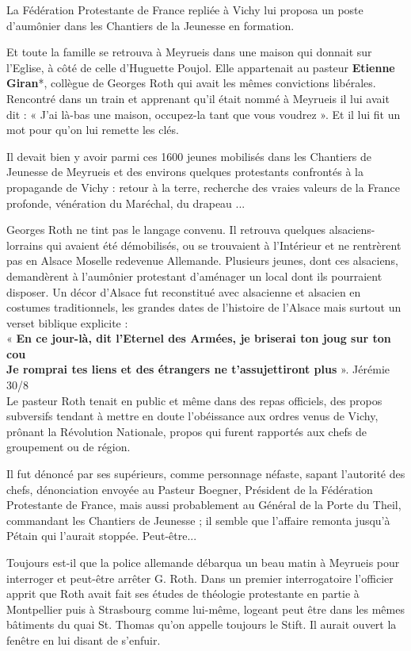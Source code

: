 La Fédération Protestante de France repliée à Vichy lui proposa un poste d’aumônier dans les
Chantiers de la Jeunesse en formation.


Et toute la famille se retrouva à Meyrueis dans une maison qui donnait sur l’Eglise, à côté de
celle d’Huguette Poujol. Elle appartenait au pasteur \textbf{Etienne Giran}*, collègue de Georges
Roth qui avait les mêmes convictions libérales. Rencontré dans un train et apprenant qu’il
était nommé à Meyrueis il lui avait dit :
« J’ai là-bas une maison, occupez-la tant que vous voudrez ». Et il lui fit un mot pour qu’on
lui remette les clés.

Il devait bien y avoir parmi ces 1600 jeunes mobilisés dans les Chantiers de Jeunesse de
Meyrueis et des environs quelques protestants confrontés à la propagande de Vichy : retour à
la terre, recherche des vraies valeurs de la France profonde, vénération du Maréchal, du
drapeau ...

Georges Roth ne tint pas le langage convenu.
Il retrouva quelques alsaciens-lorrains qui avaient été démobilisés, ou se trouvaient à
l’Intérieur et ne rentrèrent pas en Alsace Moselle redevenue Allemande. Plusieurs jeunes,
dont ces alsaciens, demandèrent à l’aumônier protestant d’aménager un local dont ils
pourraient disposer. Un décor d’Alsace fut reconstitué avec alsacienne et alsacien en costumes
traditionnels, les grandes dates de l’histoire de l’Alsace mais surtout un verset biblique
explicite :\\

« \textbf{En ce jour-là, dit l’Eternel des Armées, je briserai ton joug sur ton cou}\\
\textbf{Je romprai tes liens et des étrangers ne t’assujettiront plus} ».
\hfill Jérémie 30/8\\

Le pasteur Roth tenait en public et même dans des repas officiels, des propos subversifs
tendant à mettre en doute l’obéissance aux ordres venus de Vichy, prônant la Révolution
Nationale, propos qui furent rapportés aux chefs de groupement ou de région.

Il fut dénoncé par ses supérieurs, comme personnage néfaste, sapant l’autorité des chefs,
dénonciation envoyée au Pasteur Boegner, Président de la Fédération Protestante de France,
mais aussi probablement au Général de la Porte du Theil, commandant les Chantiers de
Jeunesse ; il semble que l’affaire remonta jusqu’à Pétain qui l’aurait stoppée. Peut-être...

Toujours est-il que la police allemande débarqua un beau matin à Meyrueis pour interroger et
peut-être arrêter G. Roth. Dans un premier interrogatoire l’officier apprit que Roth avait fait
ses études de théologie protestante en partie à Montpellier puis à Strasbourg comme lui-même,
logeant peut être dans les mêmes bâtiments du quai St. Thomas qu’on appelle toujours le Stift.
Il aurait ouvert la fenêtre en lui disant de s’enfuir.

